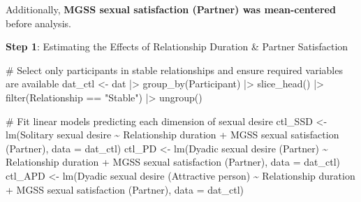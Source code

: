 \documentclass[
  bookmarksnumbered]{article}
\newenvironment{Shaded}{\begin{snugshade}}{\end{snugshade}}
\newcommand{\AttributeTok}[1]{\textcolor[rgb]{0.80,0.80,0.80}{#1}}
\newcommand{\CommentTok}[1]{\textcolor[rgb]{0.50,0.62,0.50}{#1}}
\newcommand{\FunctionTok}[1]{\textcolor[rgb]{0.94,0.94,0.56}{#1}}
\newcommand{\NormalTok}[1]{\textcolor[rgb]{0.80,0.80,0.80}{#1}}
\newcommand{\OtherTok}[1]{\textcolor[rgb]{0.94,0.94,0.56}{#1}}
\newcommand{\SpecialCharTok}[1]{\textcolor[rgb]{0.86,0.64,0.64}{#1}}
\newcommand{\StringTok}[1]{\textcolor[rgb]{0.80,0.58,0.58}{#1}}
\begin{document}
Additionally, \textbf{MGSS sexual satisfaction (Partner) was mean-centered} before analysis.

\textbf{Step 1}: Estimating the Effects of Relationship Duration \& Partner Satisfaction

\begin{Shaded}
\begin{Highlighting}[]
\CommentTok{\# Select only participants in stable relationships and ensure required variables are available}
\NormalTok{dat\_ctl }\OtherTok{\textless{}{-}}\NormalTok{ dat }\SpecialCharTok{|\textgreater{}}
  \FunctionTok{group\_by}\NormalTok{(Participant) }\SpecialCharTok{|\textgreater{}}  
  \FunctionTok{slice\_head}\NormalTok{() }\SpecialCharTok{|\textgreater{}}  
  \FunctionTok{filter}\NormalTok{(Relationship }\SpecialCharTok{==} \StringTok{"Stable"}\NormalTok{) }\SpecialCharTok{|\textgreater{}}  
  \FunctionTok{ungroup}\NormalTok{()}

\CommentTok{\# Fit linear models predicting each dimension of sexual desire}
\NormalTok{ctl\_SSD }\OtherTok{\textless{}{-}} \FunctionTok{lm}\NormalTok{(}\StringTok{\textasciigrave{}}\AttributeTok{Solitary sexual desire}\StringTok{\textasciigrave{}} \SpecialCharTok{\textasciitilde{}} 
                \StringTok{\textasciigrave{}}\AttributeTok{Relationship duration}\StringTok{\textasciigrave{}} \SpecialCharTok{+} \StringTok{\textasciigrave{}}\AttributeTok{MGSS sexual satisfaction (Partner)}\StringTok{\textasciigrave{}}\NormalTok{, }
              \AttributeTok{data =}\NormalTok{ dat\_ctl)}
\NormalTok{ctl\_PD }\OtherTok{\textless{}{-}} \FunctionTok{lm}\NormalTok{(}\StringTok{\textasciigrave{}}\AttributeTok{Dyadic sexual desire (Partner)}\StringTok{\textasciigrave{}} \SpecialCharTok{\textasciitilde{}} 
               \StringTok{\textasciigrave{}}\AttributeTok{Relationship duration}\StringTok{\textasciigrave{}} \SpecialCharTok{+} \StringTok{\textasciigrave{}}\AttributeTok{MGSS sexual satisfaction (Partner)}\StringTok{\textasciigrave{}}\NormalTok{, }
             \AttributeTok{data =}\NormalTok{ dat\_ctl)}
\NormalTok{ctl\_APD }\OtherTok{\textless{}{-}} \FunctionTok{lm}\NormalTok{(}\StringTok{\textasciigrave{}}\AttributeTok{Dyadic sexual desire (Attractive person)}\StringTok{\textasciigrave{}} \SpecialCharTok{\textasciitilde{}} 
                \StringTok{\textasciigrave{}}\AttributeTok{Relationship duration}\StringTok{\textasciigrave{}} \SpecialCharTok{+} \StringTok{\textasciigrave{}}\AttributeTok{MGSS sexual satisfaction (Partner)}\StringTok{\textasciigrave{}}\NormalTok{, }
              \AttributeTok{data =}\NormalTok{ dat\_ctl)}
\end{Highlighting}
\end{Shaded}
\end{document}
